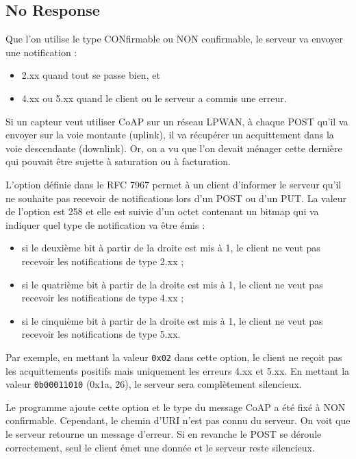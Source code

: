 \subsection{No Response}
Que l'on utilise le type CONfirmable ou NON confirmable, le serveur va envoyer une notification : 
\begin{itemize}
\item 2.xx quand tout se passe bien, et
\item 4.xx ou 5.xx quand le client ou le serveur a commis une erreur.
\end{itemize}

Si un capteur veut utiliser CoAP sur un réseau LPWAN, à chaque POST qu'il va envoyer sur la voie montante (uplink), il va récupérer un acquittement dans la voie descendante (downlink). Or, on a vu que l'on devait ménager cette dernière qui pouvait être sujette à saturation ou à facturation. 

L'option  définie dans le RFC 7967 permet à un client d'informer le serveur qu'il ne souhaite pas recevoir de notifications lors d'un POST ou d'un PUT.  La valeur de l'option est 258 et elle est suivie d'un octet contenant un bitmap qui va indiquer quel type de notification va être émis :
\begin{itemize}
    \item si le deuxième bit à partir de la droite est mis à 1, le client ne veut pas recevoir les notifications de type 2.xx ;
    \item si le quatrième bit à partir de la droite est mis à 1, le client ne veut pas recevoir les notifications de type 4.xx ;
    \item si le cinquième bit à partir de la droite est mis à 1, le client ne veut pas recevoir les notifications de type 5.xx.
\end{itemize}

Par exemple, en mettant la valeur \texttt{0x02} dans cette option, le client ne reçoit pas les acquittements positifs mais uniquement les erreurs 4.xx et 5.xx. En mettant la valeur \texttt{0b00011010} (0x1a, 26), le serveur sera complètement silencieux.

Le programme  ajoute cette option et le type du message CoAP a été fixé à NON confirmable. Cependant, le chemin d'URI n'est pas connu du serveur.  On voit que le serveur retourne un message d'erreur. Si en revanche le POST se déroule correctement, seul le client émet une donnée et le serveur reste silencieux.

